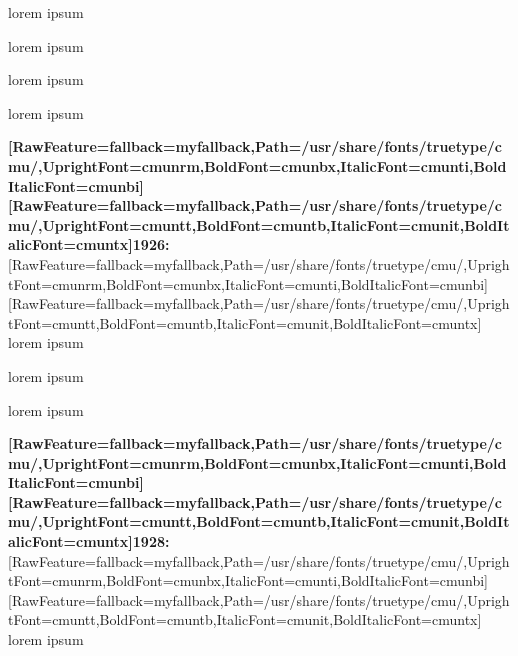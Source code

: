 

lorem ipsum
\begin{myquote}
\item{} 
\begin{myitemize}
\item{}  lorem ipsum
\end{myitemize}

\begin{myquote}
\item{} 
\begin{myquote}
\item{}  lorem ipsum
\item{}  lorem ipsum
\end{myquote}

\end{myquote}

\begin{myitemize}
\item{}  {\bfseries \allowbreak{}\setmainfont{cmunbx.ttf}[RawFeature={fallback=myfallback},Path=/usr/share/fonts/truetype/cmu/,UprightFont=cmunrm,BoldFont=cmunbx,ItalicFont=cmunti,BoldItalicFont=cmunbi]\setmonofont{cmunbx.ttf}[RawFeature={fallback=myfallback},Path=/usr/share/fonts/truetype/cmu/,UprightFont=cmuntt,BoldFont=cmuntb,ItalicFont=cmunit,BoldItalicFont=cmuntx]\bfseries 1926:}{$\text{ }$}\allowbreak{}\setmainfont{cmunrm.ttf}[RawFeature={fallback=myfallback},Path=/usr/share/fonts/truetype/cmu/,UprightFont=cmunrm,BoldFont=cmunbx,ItalicFont=cmunti,BoldItalicFont=cmunbi]\setmonofont{cmunrm.ttf}[RawFeature={fallback=myfallback},Path=/usr/share/fonts/truetype/cmu/,UprightFont=cmuntt,BoldFont=cmuntb,ItalicFont=cmunit,BoldItalicFont=cmuntx] lorem ipsum
\end{myitemize}

\begin{myquote}
\item{} 
\begin{myquote}
\item{}  lorem ipsum
\item{}  lorem ipsum
\end{myquote}

\end{myquote}

\begin{myitemize}
\item{}  {\bfseries \allowbreak{}\setmainfont{cmunbx.ttf}[RawFeature={fallback=myfallback},Path=/usr/share/fonts/truetype/cmu/,UprightFont=cmunrm,BoldFont=cmunbx,ItalicFont=cmunti,BoldItalicFont=cmunbi]\setmonofont{cmunbx.ttf}[RawFeature={fallback=myfallback},Path=/usr/share/fonts/truetype/cmu/,UprightFont=cmuntt,BoldFont=cmuntb,ItalicFont=cmunit,BoldItalicFont=cmuntx]\bfseries 1928:}{$\text{ }$}\allowbreak{}\setmainfont{cmunrm.ttf}[RawFeature={fallback=myfallback},Path=/usr/share/fonts/truetype/cmu/,UprightFont=cmunrm,BoldFont=cmunbx,ItalicFont=cmunti,BoldItalicFont=cmunbi]\setmonofont{cmunrm.ttf}[RawFeature={fallback=myfallback},Path=/usr/share/fonts/truetype/cmu/,UprightFont=cmuntt,BoldFont=cmuntb,ItalicFont=cmunit,BoldItalicFont=cmuntx] lorem ipsum 
\end{myitemize}


\end{myquote}
